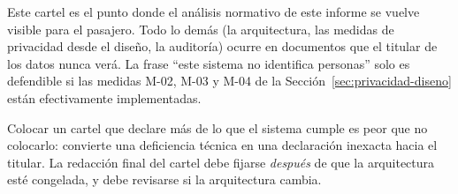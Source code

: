 Este cartel es el punto donde el análisis normativo de este informe se
vuelve visible para el pasajero. Todo lo demás (la arquitectura, las
medidas de privacidad desde el diseño, la auditoría) ocurre en
documentos que el titular de los datos nunca verá. La frase
\enquote{este sistema no identifica personas} solo es defendible si las
medidas M-02, M-03 y M-04 de la Sección~\ref{sec:privacidad-diseno}
están efectivamente implementadas.

Colocar un cartel que declare más de lo que el
sistema cumple es peor que no colocarlo: convierte una deficiencia
técnica en una declaración inexacta hacia el titular. La redacción final
del cartel debe fijarse \emph{después} de que la arquitectura esté
congelada, y debe revisarse si la arquitectura cambia.
